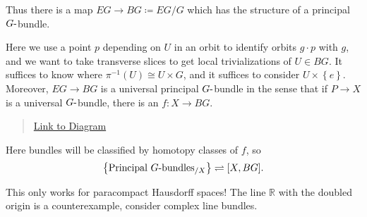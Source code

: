 \begin{remark}

Thus there is a map \(EG \to BG \coloneqq EG/G\) which has the structure
of a principal \(G{\hbox{-}}\)bundle.

\begin{figure}
\centering
{}
\end{figure}

Here we use a point \(p\) depending on \(U\) in an orbit to identify
orbits \(g\cdot p\) with \(g\), and we want to take transverse slices to
get local trivializations of \(U\in BG\). It suffices to know where
\(\pi ^{-1} (U) \cong U \times G\), and it suffices to consider
\(U \times\left\{{e}\right\}\). Moreover, \(EG\to BG\) is a universal
principal \(G{\hbox{-}}\)bundle in the sense that if \(P\to X\) is a
universal \(G{\hbox{-}}\)bundle, there is an \(f:X\to BG\).

\begin{center}
\end{center}

\begin{quote}
\href{https://q.uiver.app/?q=WzAsNCxbMCwyLCJYIl0sWzIsMCwiRUciXSxbMiwyLCJCRyJdLFswLDAsIlAiXSxbMywwXSxbMCwyLCJmIl0sWzEsMl0sWzMsMSwiIiwyLHsic3R5bGUiOnsiYm9keSI6eyJuYW1lIjoiZGFzaGVkIn19fV1d}{Link
to Diagram}
\end{quote}

Here bundles will be classified by homotopy classes of \(f\), so
\begin{align*}
\left\{{\text{Principal $G{\hbox{-}}$bundles} {}_{/ X} }\right\} \rightleftharpoons[X, BG]
.\end{align*}

\end{remark}

\begin{warnings}

This only works for paracompact Hausdorff spaces! The line
\({\mathbb{R}}\) with the doubled origin is a counterexample, consider
complex line bundles.

\end{warnings}

